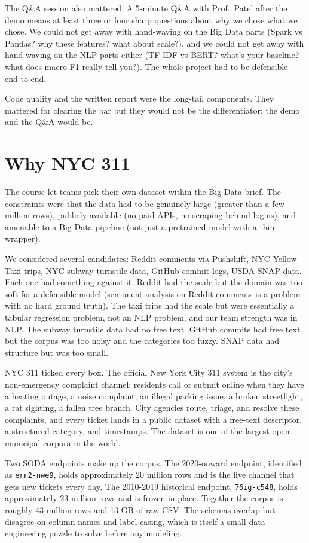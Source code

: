 \documentclass[11pt,letterpaper]{book}
\begin{document}
The Q\&A session also mattered. A 5-minute Q\&A with Prof.\ Patel after the demo means at least three or four sharp questions about why we chose what we chose. We could not get away with hand-waving on the Big Data parts (Spark vs Pandas? why these features? what about scale?), and we could not get away with hand-waving on the NLP parts either (TF-IDF vs BERT? what's your baseline? what does macro-F1 really tell you?). The whole project had to be defensible end-to-end.

Code quality and the written report were the long-tail components. They mattered for clearing the bar but they would not be the differentiator; the demo and the Q\&A would be.

\section{Why NYC 311}

The course let teams pick their own dataset within the Big Data brief. The constraints were that the data had to be genuinely large (greater than a few million rows), publicly available (no paid APIs, no scraping behind logins), and amenable to a Big Data pipeline (not just a pretrained model with a thin wrapper).

We considered several candidates: Reddit comments via Pushshift, NYC Yellow Taxi trips, NYC subway turnstile data, GitHub commit logs, USDA SNAP data. Each one had something against it. Reddit had the scale but the domain was too soft for a defensible model (sentiment analysis on Reddit comments is a problem with no hard ground truth). The taxi trips had the scale but were essentially a tabular regression problem, not an NLP problem, and our team strength was in NLP. The subway turnstile data had no free text. GitHub commits had free text but the corpus was too noisy and the categories too fuzzy. SNAP data had structure but was too small.

NYC 311 ticked every box. The official New York City 311 system is the city's non-emergency complaint channel: residents call or submit online when they have a heating outage, a noise complaint, an illegal parking issue, a broken streetlight, a rat sighting, a fallen tree branch. City agencies route, triage, and resolve these complaints, and every ticket lands in a public dataset with a free-text descriptor, a structured category, and timestamps. The dataset is one of the largest open municipal corpora in the world.

Two SODA endpoints make up the corpus. The 2020-onward endpoint, identified as \texttt{erm2-nwe9}, holds approximately 20 million rows and is the live channel that gets new tickets every day. The 2010-2019 historical endpoint, \texttt{76ig-c548}, holds approximately 23 million rows and is frozen in place. Together the corpus is roughly 43 million rows and 13 GB of raw CSV. The schemas overlap but disagree on column names and label casing, which is itself a small data engineering puzzle to solve before any modeling.
\end{document}
